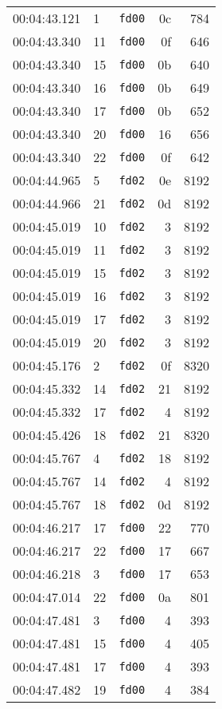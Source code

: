 \documentclass{article}
\begin{document}
\begin{longtable}{lllrr}
00:04:43.121 & 1 & \texttt{fd00} & 0c & 784 \\
00:04:43.340 & 11 & \texttt{fd00} & 0f & 646 \\
00:04:43.340 & 15 & \texttt{fd00} & 0b & 640 \\
00:04:43.340 & 16 & \texttt{fd00} & 0b & 649 \\
00:04:43.340 & 17 & \texttt{fd00} & 0b & 652 \\
00:04:43.340 & 20 & \texttt{fd00} & 16 & 656 \\
00:04:43.340 & 22 & \texttt{fd00} & 0f & 642 \\
00:04:44.965 & 5 & \texttt{fd02} & 0e & 8192 \\
00:04:44.966 & 21 & \texttt{fd02} & 0d & 8192 \\
00:04:45.019 & 10 & \texttt{fd02} & 3 & 8192 \\
00:04:45.019 & 11 & \texttt{fd02} & 3 & 8192 \\
00:04:45.019 & 15 & \texttt{fd02} & 3 & 8192 \\
00:04:45.019 & 16 & \texttt{fd02} & 3 & 8192 \\
00:04:45.019 & 17 & \texttt{fd02} & 3 & 8192 \\
00:04:45.019 & 20 & \texttt{fd02} & 3 & 8192 \\
00:04:45.176 & 2 & \texttt{fd02} & 0f & 8320 \\
00:04:45.332 & 14 & \texttt{fd02} & 21 & 8192 \\
00:04:45.332 & 17 & \texttt{fd02} & 4 & 8192 \\
00:04:45.426 & 18 & \texttt{fd02} & 21 & 8320 \\
00:04:45.767 & 4 & \texttt{fd02} & 18 & 8192 \\
00:04:45.767 & 14 & \texttt{fd02} & 4 & 8192 \\
00:04:45.767 & 18 & \texttt{fd02} & 0d & 8192 \\
00:04:46.217 & 17 & \texttt{fd00} & 22 & 770 \\
00:04:46.217 & 22 & \texttt{fd00} & 17 & 667 \\
00:04:46.218 & 3 & \texttt{fd00} & 17 & 653 \\
00:04:47.014 & 22 & \texttt{fd00} & 0a & 801 \\
00:04:47.481 & 3 & \texttt{fd00} & 4 & 393 \\
00:04:47.481 & 15 & \texttt{fd00} & 4 & 405 \\
00:04:47.481 & 17 & \texttt{fd00} & 4 & 393 \\
00:04:47.482 & 19 & \texttt{fd00} & 4 & 384 \\

\end{longtable}
\end{document}
